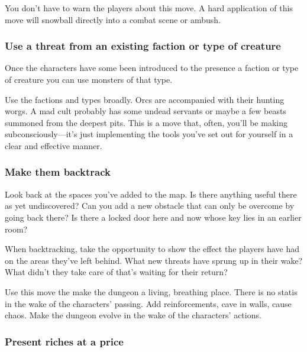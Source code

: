        

You don't have to warn the players about this move. A hard application of this move will snowball directly into a combat scene or ambush.

       
\subsubsection{Use a threat from an existing faction or type of creature}      
       

Once the characters have some been introduced to the presence a faction or type of creature you can use monsters of that type.

       

Use the factions and types broadly. Orcs are accompanied with their hunting worgs. A mad cult probably has some undead servants or maybe a few beasts summoned from the deepest pits. This is a move that, often, you'll be making subconsciously—it's just implementing the tools you've set out for yourself in a clear and effective manner.

       
\subsubsection{Make them backtrack}   
       

Look back at the spaces you've added to the map. Is there anything useful there as yet undiscovered? Can you add a new obstacle that can only be overcome by going back there? Is there a locked door here and now whose key lies in an earlier room?

       

When backtracking, take the opportunity to show the effect the players have had on the areas they've left behind. What new threats have sprung up in their wake? What didn't they take care of that's waiting for their return?

       

Use this move the make the dungeon a living, breathing place. There is no statis in the wake of the characters' passing. Add reinforcements, cave in walls, cause chaos. Make the dungeon evolve in the wake of the characters' actions.

       
\subsubsection{Present riches at a price}     
       

